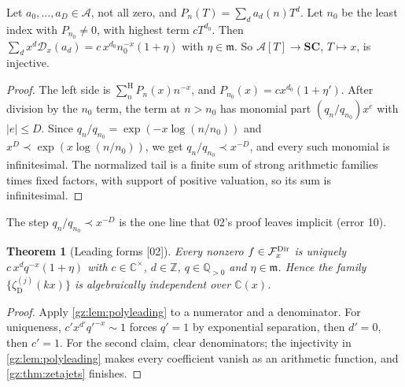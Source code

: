 \documentclass[11pt,a4paper]{article}
\numberwithin{equation}{section}
\newtheorem{theorem}{Theorem}[section]
\theoremstyle{definition}
\theoremstyle{remark}
\newcommand{\SC}{\mathbf{SC}}
\newcommand{\C}{\mathbb C}
\newcommand{\Q}{\mathbb Q}
\newcommand{\Z}{\mathbb Z}
\newcommand{\mm}{\mathfrak m}
\newcommand{\Sh}{\mathop{\textstyle\sum}\nolimits^{\mathrm H}}
\newcommand{\zD}{\zeta_{\mathrm D}}
\newcommand{\DD}{\mathcal D}
\newcommand{\Arith}{\mathcal A}
\newcommand{\src}[1]{\textup{[#1]}}
\begin{document}
\begin{lemma}[Polynomial coefficients \src{02}]\label{gz:lem:polyleading}
Let $a_0,\dots,a_D\in\Arith$, not all zero, and $P_n(T)=\sum_da_d(n)T^d$. Let
$n_0$ be the least index with $P_{n_0}\ne0$, with highest term $cT^{d_0}$.
Then $\sum_dx^d\DD_x(a_d)=c\,x^{d_0}n_0^{-x}(1+\eta)$ with $\eta\in\mm$. So
$\Arith[T]\to\SC$, $T\mapsto x$, is injective.
\end{lemma}
\begin{proof}
The left side is $\Sh_nP_n(x)n^{-x}$, and $P_{n_0}(x)=cx^{d_0}(1+\eta')$.
After division by the $n_0$ term, the term at $n>n_0$ has monomial part
$(q_n/q_{n_0})x^{e}$ with $|e|\le D$. Since $q_n/q_{n_0}=\exp(-x\log(n/n_0))$
and $x^D\prec\exp(x\log(n/n_0))$, we get $q_n/q_{n_0}\prec x^{-D}$, and every
such monomial is infinitesimal. The normalized tail is a finite sum of strong
arithmetic families times fixed factors, with support of positive
valuation, so its sum is infinitesimal.
\end{proof}
The step $q_n/q_{n_0}\prec x^{-D}$ is the one line that 02's proof leaves
implicit (error 10).

\begin{theorem}[Leading forms \src{02}]\label{gz:thm:fieldleading}
Every nonzero $f\in\mathcal F_x^{\rm Dir}$ is uniquely
$c\,x^dq^{-x}(1+\eta)$ with $c\in\C^\times$, $d\in\Z$, $q\in\Q_{>0}$ and
$\eta\in\mm$. Hence the family $\{\zD^{(j)}(kx)\}$ is algebraically
independent over $\C(x)$.
\end{theorem}
\begin{proof}
Apply \cref{gz:lem:polyleading} to a numerator and a denominator. For
uniqueness, $c'x^{d'}q'^{-x}\sim1$ forces $q'=1$ by exponential separation,
then $d'=0$, then $c'=1$. For the second claim, clear denominators; the
injectivity in \cref{gz:lem:polyleading} makes every coefficient vanish as an
arithmetic function, and \cref{gz:thm:zetajets} finishes.
\end{proof}
\end{document}
